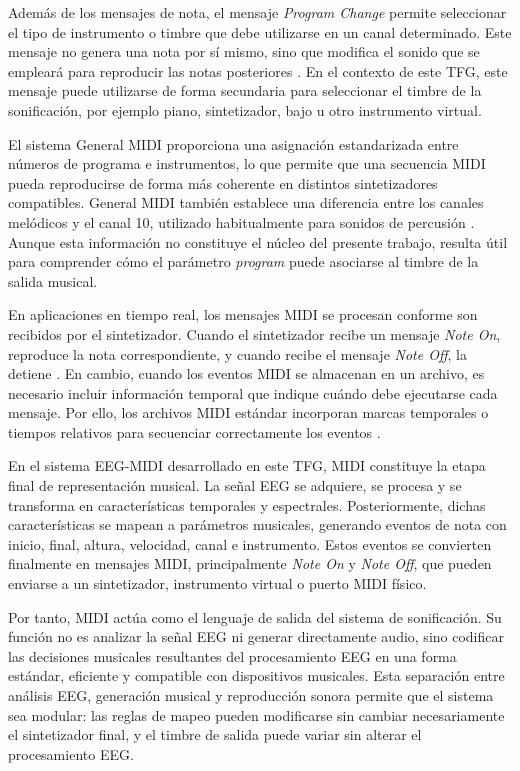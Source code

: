 \documentclass[../main.tex]{subfiles}
\begin{document}
Además de los mensajes de nota, el mensaje \textit{Program Change} permite seleccionar el tipo de instrumento o timbre que debe utilizarse en un canal determinado. Este mensaje no genera una nota por sí mismo, sino que modifica el sonido que se empleará para reproducir las notas posteriores \cite{Heckroth1995}. En el contexto de este TFG, este mensaje puede utilizarse de forma secundaria para seleccionar el timbre de la sonificación, por ejemplo piano, sintetizador, bajo u otro instrumento virtual.

El sistema General MIDI proporciona una asignación estandarizada entre números de programa e instrumentos, lo que permite que una secuencia MIDI pueda reproducirse de forma más coherente en distintos sintetizadores compatibles. General MIDI también establece una diferencia entre los canales melódicos y el canal 10, utilizado habitualmente para sonidos de percusión \cite{Heckroth1995}. Aunque esta información no constituye el núcleo del presente trabajo, resulta útil para comprender cómo el parámetro \textit{program} puede asociarse al timbre de la salida musical.

En aplicaciones en tiempo real, los mensajes MIDI se procesan conforme son recibidos por el sintetizador. Cuando el sintetizador recibe un mensaje \textit{Note On}, reproduce la nota correspondiente, y cuando recibe el mensaje \textit{Note Off}, la detiene \cite{Heckroth1995}. En cambio, cuando los eventos MIDI se almacenan en un archivo, es necesario incluir información temporal que indique cuándo debe ejecutarse cada mensaje. Por ello, los archivos MIDI estándar incorporan marcas temporales o tiempos relativos para secuenciar correctamente los eventos \cite{Heckroth1995}.

En el sistema EEG-MIDI desarrollado en este TFG, MIDI constituye la etapa final de representación musical. La señal EEG se adquiere, se procesa y se transforma en características temporales y espectrales. Posteriormente, dichas características se mapean a parámetros musicales, generando eventos de nota con inicio, final, altura, velocidad, canal e instrumento. Estos eventos se convierten finalmente en mensajes MIDI, principalmente \textit{Note On} y \textit{Note Off}, que pueden enviarse a un sintetizador, instrumento virtual o puerto MIDI físico.

Por tanto, MIDI actúa como el lenguaje de salida del sistema de sonificación. Su función no es analizar la señal EEG ni generar directamente audio, sino codificar las decisiones musicales resultantes del procesamiento EEG en una forma estándar, eficiente y compatible con dispositivos musicales. Esta separación entre análisis EEG, generación musical y reproducción sonora permite que el sistema sea modular: las reglas de mapeo pueden modificarse sin cambiar necesariamente el sintetizador final, y el timbre de salida puede variar sin alterar el procesamiento EEG.
\end{document}
